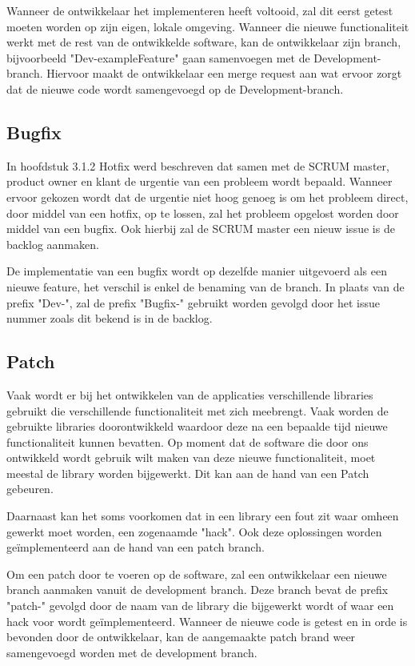 	Wanneer de ontwikkelaar het implementeren heeft voltooid, zal dit eerst getest moeten worden op zijn eigen, lokale omgeving. Wanneer die nieuwe functionaliteit werkt met de rest van de ontwikkelde software, kan de ontwikkelaar zijn branch, bijvoorbeeld \linebreak"Dev-exampleFeature" gaan samenvoegen met de Development-branch. Hiervoor maakt de ontwikkelaar een merge request aan wat ervoor zorgt dat de nieuwe code wordt \linebreak samengevoegd op de Development-branch.
	
	\subsection{Bugfix}
	In hoofdstuk 3.1.2 Hotfix werd beschreven dat samen met de SCRUM master, product owner en klant de urgentie van een probleem wordt bepaald.
	Wanneer ervoor gekozen wordt dat de urgentie niet hoog genoeg is om het probleem direct, door middel van een hotfix, op te lossen, zal het probleem opgelost worden door middel van een bugfix. Ook hierbij zal de SCRUM master een nieuw issue is de backlog aanmaken.
	
	De implementatie van een bugfix wordt op dezelfde manier uitgevoerd als een nieuwe feature, het verschil is enkel de benaming van de branch. In plaats van de prefix "Dev-", zal de prefix "Bugfix-" gebruikt worden gevolgd door het issue nummer zoals dit bekend is in de backlog.

	\subsection{Patch}
	Vaak wordt er bij het ontwikkelen van de applicaties verschillende libraries gebruikt die verschillende functionaliteit met zich meebrengt. Vaak worden de gebruikte libraries doorontwikkeld waardoor deze na een bepaalde tijd nieuwe functionaliteit kunnen bevatten. Op moment dat de software die door ons ontwikkeld wordt gebruik wilt maken van deze nieuwe functionaliteit, moet meestal de library worden bijgewerkt. Dit kan aan de hand van een Patch gebeuren. 
	
	Daarnaast kan het soms voorkomen dat in een library een fout zit waar omheen gewerkt moet worden, een zogenaamde "hack". Ook deze oplossingen worden geïmplementeerd aan de hand van een patch branch.
	
	Om een patch door te voeren op de software, zal een ontwikkelaar een nieuwe branch aanmaken vanuit de development branch. Deze branch bevat de prefix "patch-" gevolgd door de naam van de library die bijgewerkt wordt of waar een hack voor wordt geïmplementeerd. Wanneer de nieuwe code is getest en in orde is bevonden door de ontwikkelaar, kan de aangemaakte patch brand weer samengevoegd worden met de development branch.